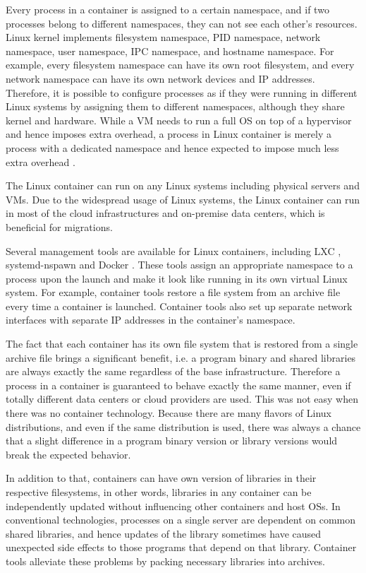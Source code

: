 Every process in a container is assigned to a certain namespace, and if two processes belong to different namespaces, they can not see each other's resources. 
Linux kernel implements filesystem namespace, PID namespace, network namespace, user namespace, IPC namespace, and hostname namespace. 
For example, every filesystem namespace can have its own root filesystem, and every network namespace can have its own network devices and IP addresses.
Therefore, it is possible to configure processes as if they were running in different Linux systems by assigning them to different namespaces, although they share kernel and hardware.
While a VM needs to run a full OS on top of a hypervisor and hence imposes extra overhead, a process in Linux container is merely a process with a dedicated namespace and hence expected to impose much less extra overhead \cite{felter2015updated}.

The Linux container can run on any Linux systems including physical servers and VMs.
Due to the widespread usage of Linux systems, the Linux container can run in most of the cloud infrastructures and on-premise data centers, which is beneficial for migrations.

Several management tools are available for Linux containers, including LXC \cite{noronha2018performance}, systemd-nspawn \cite{jedge2013} and Docker \cite{merkel2014docker}.
These tools assign an appropriate namespace to a process upon the launch and make it look like running in its own virtual Linux system.
For example, container tools restore a file system from an archive file every time a container is launched. 
Container tools also set up separate network interfaces with separate IP addresses in the container's namespace.

The fact that each container has its own file system that is restored from a single archive file brings a significant benefit, i.e. a program binary and shared libraries are always exactly the same regardless of the base infrastructure.
Therefore a process in a container is guaranteed to behave exactly the same manner, even if totally different data centers or cloud providers are used.
This was not easy when there was no container technology.
Because there are many flavors of Linux distributions, and even if the same distribution is used, there was always a chance that a slight difference in a program binary version or library versions would break the expected behavior.

In addition to that, containers can have own version of libraries in their respective filesystems, in other words, libraries in any container can be independently updated without influencing other containers and host OSs.
In conventional technologies, processes on a single server are dependent on common shared libraries, and hence updates of the library sometimes have caused unexpected side effects to those programs that depend on that library.
Container tools alleviate these problems by packing necessary libraries into archives. 

